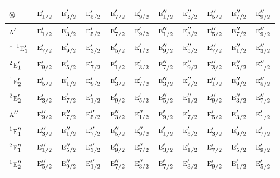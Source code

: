 \documentclass[10pt,a4paper]{article}
\numberwithin{equation}{section}
\newcommand{\irr}[1]{\text{\normalfont\scshape #1}}
\newcommand{\conjpair}[1]{{}^{#1}}
\newcommand{\irrprod}{\otimes}
\begin{document}
{\small\setlength{\tabcolsep}{3pt}\begin{longtable}{@{}lcccccccccc@{}}\toprule
$\irrprod$ & $\irr{e}_{1/2}'$ & $\irr{e}_{3/2}'$ & $\irr{e}_{5/2}'$ & $\irr{e}_{7/2}'$ & $\irr{e}_{9/2}'$ & $\irr{e}_{1/2}''$ & $\irr{e}_{3/2}''$ & $\irr{e}_{5/2}''$ & $\irr{e}_{7/2}''$ & $\irr{e}_{9/2}''$\\\midrule\endhead
\bottomrule\endfoot\endlastfoot
$\irr{a}'$ & $\irr{e}_{1/2}'$ & $\irr{e}_{3/2}'$ & $\irr{e}_{5/2}'$ & $\irr{e}_{7/2}'$ & $\irr{e}_{9/2}'$ & $\irr{e}_{1/2}''$ & $\irr{e}_{3/2}''$ & $\irr{e}_{5/2}''$ & $\irr{e}_{7/2}''$ & $\irr{e}_{9/2}''$\\*
$\conjpair{1}\irr{e}_{1}'$ & $\irr{e}_{7/2}'$ & $\irr{e}_{9/2}'$ & $\irr{e}_{3/2}'$ & $\irr{e}_{5/2}'$ & $\irr{e}_{1/2}'$ & $\irr{e}_{9/2}''$ & $\irr{e}_{5/2}''$ & $\irr{e}_{7/2}''$ & $\irr{e}_{1/2}''$ & $\irr{e}_{3/2}''$\\
$\conjpair{2}\irr{e}_{1}'$ & $\irr{e}_{9/2}'$ & $\irr{e}_{5/2}'$ & $\irr{e}_{7/2}'$ & $\irr{e}_{1/2}'$ & $\irr{e}_{3/2}'$ & $\irr{e}_{7/2}''$ & $\irr{e}_{9/2}''$ & $\irr{e}_{3/2}''$ & $\irr{e}_{5/2}''$ & $\irr{e}_{1/2}''$\\
$\conjpair{1}\irr{e}_{2}'$ & $\irr{e}_{5/2}'$ & $\irr{e}_{1/2}'$ & $\irr{e}_{9/2}'$ & $\irr{e}_{3/2}'$ & $\irr{e}_{7/2}'$ & $\irr{e}_{3/2}''$ & $\irr{e}_{7/2}''$ & $\irr{e}_{1/2}''$ & $\irr{e}_{9/2}''$ & $\irr{e}_{5/2}''$\\
$\conjpair{2}\irr{e}_{2}'$ & $\irr{e}_{3/2}'$ & $\irr{e}_{7/2}'$ & $\irr{e}_{1/2}'$ & $\irr{e}_{9/2}'$ & $\irr{e}_{5/2}'$ & $\irr{e}_{5/2}''$ & $\irr{e}_{1/2}''$ & $\irr{e}_{9/2}''$ & $\irr{e}_{3/2}''$ & $\irr{e}_{7/2}''$\\
$\irr{a}''$ & $\irr{e}_{9/2}''$ & $\irr{e}_{7/2}''$ & $\irr{e}_{5/2}''$ & $\irr{e}_{3/2}''$ & $\irr{e}_{1/2}''$ & $\irr{e}_{9/2}'$ & $\irr{e}_{7/2}'$ & $\irr{e}_{5/2}'$ & $\irr{e}_{3/2}'$ & $\irr{e}_{1/2}'$\\
$\conjpair{1}\irr{e}_{1}''$ & $\irr{e}_{3/2}''$ & $\irr{e}_{1/2}''$ & $\irr{e}_{7/2}''$ & $\irr{e}_{5/2}''$ & $\irr{e}_{9/2}''$ & $\irr{e}_{1/2}'$ & $\irr{e}_{5/2}'$ & $\irr{e}_{3/2}'$ & $\irr{e}_{9/2}'$ & $\irr{e}_{7/2}'$\\
$\conjpair{2}\irr{e}_{1}''$ & $\irr{e}_{1/2}''$ & $\irr{e}_{5/2}''$ & $\irr{e}_{3/2}''$ & $\irr{e}_{9/2}''$ & $\irr{e}_{7/2}''$ & $\irr{e}_{3/2}'$ & $\irr{e}_{1/2}'$ & $\irr{e}_{7/2}'$ & $\irr{e}_{5/2}'$ & $\irr{e}_{9/2}'$\\
$\conjpair{1}\irr{e}_{2}''$ & $\irr{e}_{5/2}''$ & $\irr{e}_{9/2}''$ & $\irr{e}_{1/2}''$ & $\irr{e}_{7/2}''$ & $\irr{e}_{3/2}''$ & $\irr{e}_{7/2}'$ & $\irr{e}_{3/2}'$ & $\irr{e}_{9/2}'$ & $\irr{e}_{1/2}'$ & $\irr{e}_{5/2}'$\\

\end{longtable}}
\end{document}
